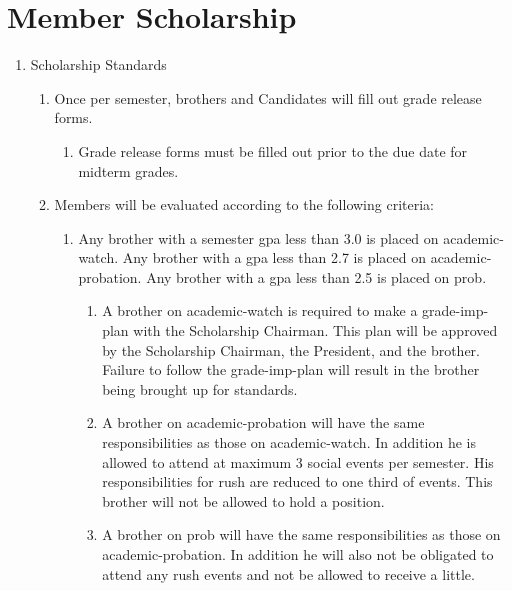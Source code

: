 \section{Member Scholarship}
	\label{member-schol-stds}
	\begin{enumerate}

	\item Scholarship Standards
		\begin{enumerate}
			\item Once per semester, brothers and Candidates will fill out grade release forms.
			\begin{enumerate}
				\item Grade release forms must be filled out prior to the due date for midterm grades.
			\end{enumerate}

			\item Members will be evaluated according to the following criteria:\label{academic-probation}	
			\begin{enumerate}
				\item Any brother with a semester \gls{gpa} less than 3.0 is placed on \gls{academic-watch}.  Any brother with a  \gls{gpa} less than 2.7 is placed on \gls{academic-probation}. Any brother with a \gls{gpa} less than 2.5 is placed on \gls{prob}.
				
				\begin{enumerate}
					\item A brother on \gls{academic-watch} is required to make a \gls{grade-imp-plan} with the Scholarship Chairman. This plan will be approved by the Scholarship Chairman, the President, and the brother. Failure to follow the \gls{grade-imp-plan} will result in the brother being brought up for standards.
					\label{academic-watch} 
					
					\item A brother on \gls{academic-probation} will have the same responsibilities as those on \gls{academic-watch}. In addition he is allowed to attend at maximum 3 social events per semester. His responsibilities for rush are reduced to one third of events. This brother will not be allowed to hold a position. \label{officer-eligibility}
					\label{academic-probation} 
					
					\item A brother on \gls{prob} will have the same responsibilities as those on \gls{academic-probation}.  In addition he will also not be obligated to attend any rush events and not be allowed to receive a little.
				\end{enumerate}


\end{enumerate}
\end{enumerate}
\end{enumerate}
